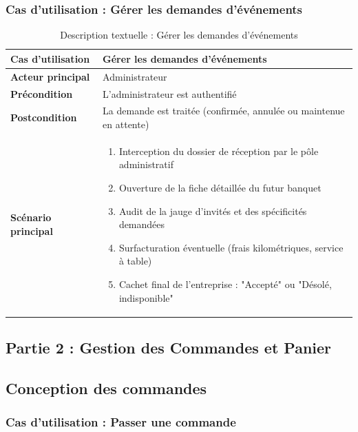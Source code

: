 \subsubsection{Cas d'utilisation : Gérer les demandes d'événements}

\begin{table}[H]
    \centering
    \caption{Description textuelle : Gérer les demandes d'événements}
    \label{tab:desc_gerer_events}
    \renewcommand{\arraystretch}{1.3}
    \begin{tabular}{|p{4cm}|p{8.5cm}|}
        \hline
        \textbf{Cas d'utilisation} & Gérer les demandes d'événements \\
        \hline
        \textbf{Acteur principal} & Administrateur \\
        \hline
        \textbf{Précondition} & L'administrateur est authentifié \\
        \hline
        \textbf{Postcondition} & La demande est traitée (confirmée, annulée ou maintenue en attente) \\
        \hline
        \textbf{Scénario principal} &
        \begin{enumerate}
            \item Interception du dossier de réception par le pôle administratif
            \item Ouverture de la fiche détaillée du futur banquet
            \item Audit de la jauge d'invités et des spécificités demandées
            \item Surfacturation éventuelle (frais kilométriques, service à table)
            \item Cachet final de l'entreprise : "Accepté" ou "Désolé, indisponible"
        \end{enumerate} \\
        \hline
    \end{tabular}
\end{table}

\subsection{Partie 2 : Gestion des Commandes et Panier}

\subsection{Conception des commandes}

\subsubsection{Cas d'utilisation : Passer une commande}


